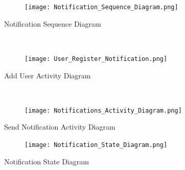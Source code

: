 \documentclass{article}
\begin{document}
\begin{figure}[h!]
  \texttt{[image: Notification\_Sequence\_Diagram.png]}
\end{figure}
Notification Sequence Diagram

\mbox{}\\
\bigskip


\begin{figure}[h!]
  \texttt{[image: User\_Register\_Notification.png]}
\end{figure}
Add User Activity Diagram

\mbox{}\\
\bigskip
\clearpage

\begin{figure}[h!]
  \texttt{[image: Notifications\_Activity\_Diagram.png]}
\end{figure}
Send Notification Activity Diagram

\begin{figure}[h!]
  \texttt{[image: Notification\_State\_Diagram.png]}
\end{figure}
Notification State Diagram

\mbox{}\\
\end{document}
